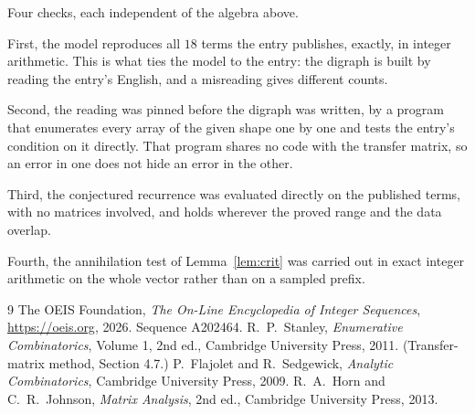 \documentclass[11pt,a4paper]{article}
\theoremstyle{plain}
\theoremstyle{definition}
\begin{document}
Four checks, each independent of the algebra above.

First, the model reproduces all $18$ terms the entry publishes, exactly, in integer
arithmetic. This is what ties the model to the entry: the digraph is built by reading the
entry's English, and a misreading gives different counts.

Second, the reading was pinned before the digraph was written, by a program that enumerates
every array of the given shape one by one and tests the entry's condition on it directly. That program shares no code with the transfer matrix, so an error in one does not
hide an error in the other.

Third, the conjectured recurrence was evaluated directly on the published terms, with no
matrices involved, and holds wherever the proved range and the data overlap.

Fourth, the annihilation test of Lemma~\ref{lem:crit} was carried out in exact integer
arithmetic on the whole vector rather than on a sampled prefix.

\begin{thebibliography}{9}
 The OEIS Foundation, \emph{The On-Line Encyclopedia of Integer
Sequences}, \url{https://oeis.org}, 2026. Sequence A202464.
 R.~P.~Stanley, \emph{Enumerative Combinatorics}, Volume 1, 2nd ed.,
Cambridge University Press, 2011. (Transfer-matrix method, Section 4.7.)
 P.~Flajolet and R.~Sedgewick, \emph{Analytic Combinatorics}, Cambridge
University Press, 2009.
 R.~A.~Horn and C.~R.~Johnson, \emph{Matrix Analysis}, 2nd ed., Cambridge
University Press, 2013.
\end{thebibliography}
\end{document}
